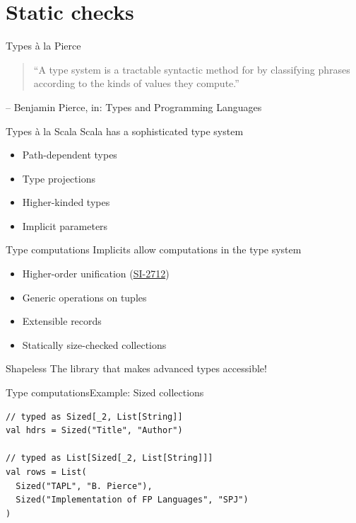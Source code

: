 \documentclass[compress,xcolor={usenames,dvipsnames,table}]{beamer}
\begin{document}
  \section{Static checks}

\begin{frame}{Types à la Pierce}
  \begin{quote}
    ``A type system is a tractable syntactic method for  by classifying phrases according to the kinds of values they compute.''
  \end{quote}
  \hfill -- Benjamin Pierce, in: Types and Programming Languages
\end{frame}

\begin{frame}{Types à la Scala}
  Scala has a sophisticated type system
  \begin{itemize}
    \item Path-dependent types
    \item Type projections
    \item Higher-kinded types
    \item Implicit parameters
  \end{itemize}
\end{frame}

\begin{frame}{Type computations}
  Implicits allow computations in the type system

  \begin{itemize}
    \item Higher-order unification (\href{https://issues.scala-lang.org/browse/SI-2712}{SI-2712})
    \item Generic operations on tuples
    \item Extensible records
    \item Statically size-checked collections
  \end{itemize}
\end{frame}

\begin{frame}{Shapeless}
  The library that makes advanced types accessible!
\end{frame}

\begin{frame}[fragile]{Type computations}{Example: Sized collections}
  \begin{verbatim}
// typed as Sized[_2, List[String]]
val hdrs = Sized("Title", "Author")

// typed as List[Sized[_2, List[String]]]
val rows = List(
  Sized("TAPL", "B. Pierce"),
  Sized("Implementation of FP Languages", "SPJ")
)
  \end{verbatim}

\end{frame}
\end{document}
